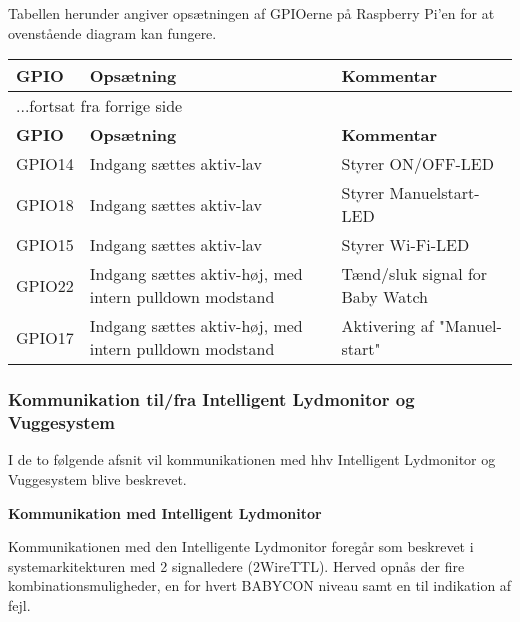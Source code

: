 Tabellen herunder angiver opsætningen af GPIOerne på Raspberry Pi'en for at ovenstående diagram kan fungere.

\begin{center}
\label{ctrl:raspberry_pi_setup}
\begin{longtable}{|p{3cm}|p{4cm}|p{4cm}|}
\hline
\textbf{GPIO}	&\textbf{Opsætning} 		&\textbf{Kommentar} 	\\ \hline
\endfirsthead
\multicolumn{3}{l}{...fortsat fra forrige side} \\ \hline 
\textbf{GPIO}	&\textbf{Opsætning} 		&\textbf{Kommentar}  \\ \hline
\endhead



GPIO14
&Indgang sættes aktiv-lav
&Styrer ON/OFF-LED

\\\hline

GPIO18
&Indgang sættes aktiv-lav
&Styrer Manuelstart-LED

\\\hline


GPIO15
&Indgang sættes aktiv-lav
&Styrer Wi-Fi-LED

\\\hline

GPIO22
&Indgang sættes aktiv-høj, med intern pulldown modstand
&Tænd/sluk signal for Baby Watch

\\\hline

GPIO17
&Indgang sættes aktiv-høj, med intern pulldown modstand
&Aktivering af "Manuel-start"
\\\hline

\end{longtable}
\end{center}

\subsubsection*{Kommunikation til/fra Intelligent Lydmonitor og Vuggesystem}

I de to følgende afsnit vil kommunikationen med hhv Intelligent Lydmonitor og Vuggesystem blive beskrevet.

\textbf{Kommunikation med Intelligent Lydmonitor}

Kommunikationen med den Intelligente Lydmonitor foregår som beskrevet i systemarkitekturen med 2 signalledere (2WireTTL). Herved opnås der fire kombinationsmuligheder, en for hvert BABYCON niveau samt en til indikation  af fejl.

